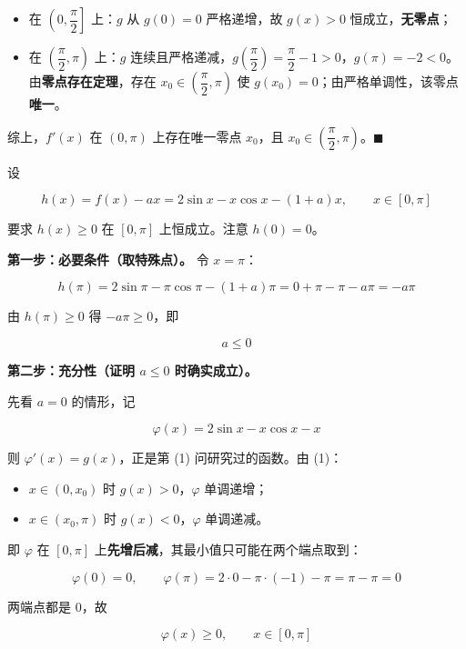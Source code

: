 \begin{answer}
\begin{itemize}
\item 在 $\left(0,\dfrac\pi2\right]$ 上：$g$ 从 $g(0)=0$ 严格递增，故 $g(x)>0$ 恒成立，\textbf{无零点}；
\item 在 $\left(\dfrac\pi2,\pi\right)$ 上：$g$ 连续且严格递减，$g\!\left(\dfrac\pi2\right)=\dfrac\pi2-1>0$，$g(\pi)=-2<0$。由\textbf{零点存在定理}，存在 $x_0\in\left(\dfrac\pi2,\pi\right)$ 使 $g\left(x_0\right)=0$；由严格单调性，该零点\textbf{唯一}。
\end{itemize}

综上，$f'(x)$ 在 $(0,\pi)$ 上存在唯一零点 $x_0$，且 $x_0\in\left(\dfrac\pi2,\pi\right)$。$\blacksquare$


设

\nopagebreak[4]
\[h(x)=f(x)-ax=2\sin x-x\cos x-(1+a)x,\qquad x\in[0,\pi]\]

要求 $h(x)\ge0$ 在 $[0,\pi]$ 上恒成立。注意 $h(0)=0$。

\textbf{第一步：必要条件（取特殊点）。} 令 $x=\pi$：

\nopagebreak[4]
\[h(\pi)=2\sin\pi-\pi\cos\pi-(1+a)\pi=0+\pi-\pi-a\pi=-a\pi\]

由 $h(\pi)\ge0$ 得 $-a\pi\ge0$，即

\nopagebreak[4]
\[a\le0\]

\textbf{第二步：充分性（证明 $a\le0$ 时确实成立）。}

先看 $a=0$ 的情形，记

\nopagebreak[4]
\[\varphi(x)=2\sin x-x\cos x-x\]

则 $\varphi'(x)=g(x)$，正是第 (1) 问研究过的函数。由 (1)：

\begin{itemize}
\item $x\in\left(0,x_0\right)$ 时 $g(x)>0$，$\varphi$ 单调递增；
\item $x\in\left(x_0,\pi\right)$ 时 $g(x)<0$，$\varphi$ 单调递减。
\end{itemize}

即 $\varphi$ 在 $[0,\pi]$ 上\textbf{先增后减}，其最小值只可能在两个端点取到：

\nopagebreak[4]
\[\varphi(0)=0,\qquad \varphi(\pi)=2\cdot0-\pi\cdot(-1)-\pi=\pi-\pi=0\]

两端点都是 $0$，故

\nopagebreak[4]
\[\varphi(x)\ge0,\qquad x\in[0,\pi]\]


\end{answer}
